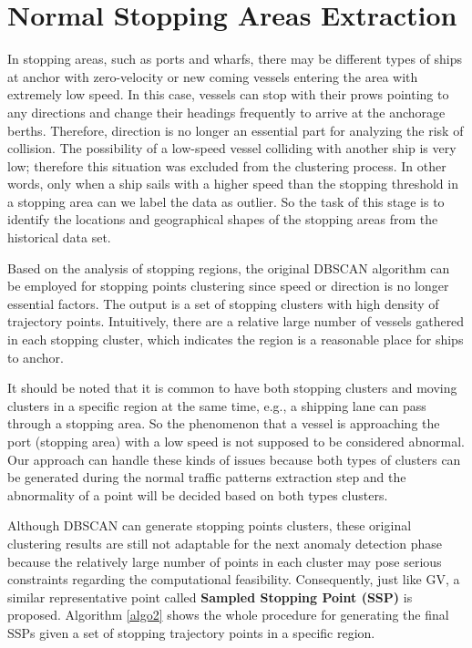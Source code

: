 \documentclass[12pt,glossary]{dalcsthesis}
\begin{document}

\section{Normal Stopping Areas Extraction}
\label{sec:normal_stopping_model}

In stopping areas, such as ports and wharfs, there may be different types of ships at anchor with zero-velocity or new coming vessels entering the area with extremely low speed. In this case, vessels can stop with their prows pointing to any directions and change their headings frequently to arrive at the anchorage berths. Therefore, direction is no longer an essential part for analyzing the risk of collision. The possibility of a low-speed vessel colliding with another ship is very low; therefore this situation was excluded from the clustering process. In other words, only when a ship sails with a higher speed than the stopping threshold in a stopping area can we label the data as outlier. So the task of this stage is to identify the locations and geographical shapes of the stopping areas from the historical data set.


Based on the analysis of stopping regions,  the original DBSCAN \cite{DBScan96} algorithm can be employed for stopping points clustering since speed or direction is no longer essential factors. The output is a set of stopping clusters with high density of trajectory points. Intuitively, there are a relative large number of vessels gathered in each stopping cluster, which indicates the region is a reasonable place for ships to anchor. 

It should be noted that it is common to have both stopping clusters and moving clusters in a specific region at the same time, e.g., a shipping lane can pass through a stopping area. So the phenomenon that a vessel is approaching the port (stopping area) with a low speed is not supposed to be considered abnormal.  Our approach can handle these kinds of issues because both types of clusters can be generated during the normal traffic patterns extraction step and the abnormality of a point will be decided based on both types clusters.



Although DBSCAN \cite{DBScan96} can generate stopping points clusters, these original clustering results are still not adaptable for the next anomaly detection phase because the relatively large number of points in each cluster may pose serious constraints regarding the computational feasibility. Consequently, just like GV, a similar representative point called  \textbf{Sampled Stopping Point (SSP)} is proposed. Algorithm \ref{algo2} shows the whole procedure for generating the final SSPs given a set of stopping trajectory points in a specific region. 
\end{document}
